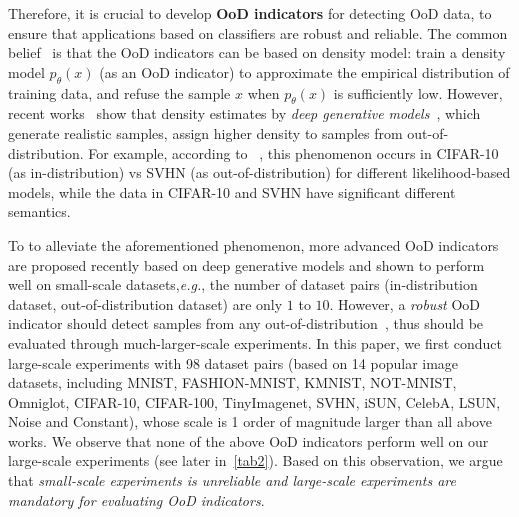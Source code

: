 \documentclass[letterpaper]{article} %
\newcommand{\EG}{\textit{e.g.}, }
\begin{document}
Therefore, it is crucial to develop \textbf{OoD indicators} for detecting OoD data, to ensure that applications based on classifiers are robust and reliable. The common belief~\cite{bishop1994novelty} is that  the OoD indicators can be based on density model: train a density model $p_\theta(x)$ (as an OoD indicator) to approximate the empirical distribution of training data, and refuse the sample $x$ when $p_\theta(x)$ is sufficiently low. 
However, recent works~\cite{nalisnick2019do,choi2018waic,hendrycks2018deep} show that density estimates by \textit{deep generative models}~\cite{dinh2016density,tomczak2018vae,takahashi2019variational,van2016conditional}, which generate realistic samples, assign higher density to samples from out-of-distribution. For example, according to ~\cite{nalisnick2019do}, this phenomenon occurs in CIFAR-10 (as in-distribution) vs SVHN (as out-of-distribution) for different likelihood-based models, while the data in CIFAR-10 and SVHN have significant different semantics. 

To to alleviate the aforementioned phenomenon, more advanced OoD indicators \cite{serra2019input,song2017pixeldefend,choi2018waic,ren2019likelihood,song2019unsupervised,che2019deep} are proposed recently based on deep generative models and shown to perform well on small-scale datasets,\EG the number of dataset pairs (in-distribution dataset, out-of-distribution dataset) are only $1$ to $10$. 
However, a \textit{robust} OoD indicator should detect samples from any out-of-distribution~\cite{chen2020robust}, thus should be evaluated through much-larger-scale experiments. In this paper, we first conduct large-scale experiments with 98 dataset pairs (based on 14 popular image datasets, including MNIST, FASHION-MNIST, KMNIST, NOT-MNIST, Omniglot, CIFAR-10, CIFAR-100, TinyImagenet, SVHN, iSUN, CelebA, LSUN, Noise and Constant), whose scale is 1 order of magnitude larger than all above works. We observe that none of the above OoD indicators perform well on our large-scale experiments (see later in~\cref{tab2}). Based on this observation, we argue that \textit{ small-scale experiments is unreliable and large-scale experiments are mandatory for evaluating OoD indicators}.
\end{document}
